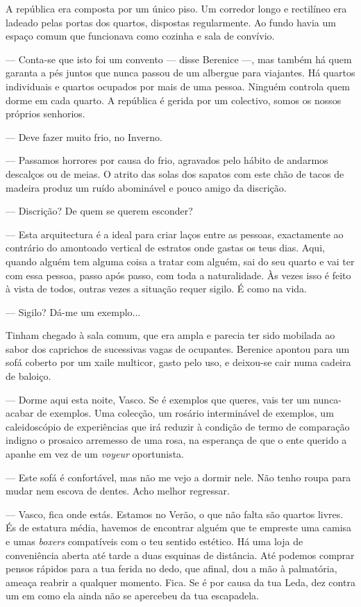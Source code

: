 A república era composta por um único piso. Um corredor longo e
rectilíneo era ladeado pelas portas dos quartos, dispostas regularmente.
Ao fundo havia um espaço comum que funcionava como cozinha e sala de
convívio.

--- Conta-se que isto foi um convento --- disse Berenice
---, mas também há quem garanta a pés juntos que nunca passou de um
albergue para viajantes. Há quartos individuais e quartos ocupados por
mais de uma pessoa. Ninguém controla quem dorme em cada quarto. A
república é gerida por um colectivo, somos os nossos próprios senhorios.

--- Deve fazer muito frio, no Inverno.

--- Passamos horrores por causa do frio, agravados pelo hábito de andarmos
  descalços ou de meias. O atrito das solas dos sapatos com este chão de
  tacos de madeira produz um ruído abominável e pouco amigo da
  discrição.

--- Discrição? De quem se querem esconder?

--- Esta arquitectura é a ideal para criar laços entre as pessoas,
  exactamente ao contrário do amontoado vertical de estratos onde gastas
  os teus dias. Aqui, quando alguém tem alguma coisa a tratar com
  alguém, sai do seu quarto e vai ter com essa pessoa, passo após passo,
  com toda a naturalidade. Às vezes isso é feito à vista de todos,
  outras vezes a situação requer sigilo. É como na vida.

--- Sigilo? Dá-me um exemplo...

Tinham chegado à sala comum, que era ampla e parecia ter sido mobilada
ao sabor dos caprichos de sucessivas vagas de ocupantes. Berenice
apontou para um sofá coberto por um xaile multicor, gasto pelo uso, e
deixou-se cair numa cadeira de baloiço.

--- Dorme aqui esta noite, Vasco. Se é exemplos que queres, vais ter um
  nunca-acabar de exemplos. Uma colecção, um rosário interminável de
  exemplos, um caleidoscópio de experiências que irá reduzir à
  condição de termo de comparação indigno o prosaico arremesso de uma
  rosa, na esperança de que o ente querido a apanhe em vez de um
  \emph{voyeur }oportunista.

--- Este sofá é confortável, mas não me vejo a dormir nele. Não tenho
  roupa para mudar nem escova de dentes. Acho melhor regressar.

--- Vasco, fica onde estás. Estamos no Verão, o que não falta são quartos
  livres. És de estatura média, havemos de encontrar alguém que te
  empreste uma camisa e umas \emph{boxers }compatíveis com o teu sentido
  estético. Há uma loja de conveniência aberta até tarde a duas
  esquinas de distância. Até podemos comprar pensos rápidos para a tua
  ferida no dedo, que afinal, dou a mão à palmatória, ameaça reabrir a
  qualquer momento. Fica. Se é por causa da tua Leda, dez contra um em
  como ela ainda não se apercebeu da tua escapadela.

